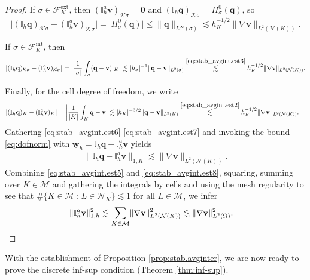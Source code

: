 \documentclass[a4paper,11pt]{article}
\theoremstyle{definition}
\theoremstyle{remark}
\newcommand{\uvec}[1]{\underline{\mathbf{#1}}}
\newcommand{\bo}[1]{\mathbf{#1}}
\newcommand{\mI}[1]{\mathbb I_h\bo{#1}}
\newcommand{\aI}[1]{\mathbb I^{a}_h\bo{#1}}
\def\ext{\text{ext}}
\def\inte{\text{int}}
\def\cF{\mathcal{F}}
\def\cK{\mathcal{K}}
\def\cM{\mathcal{M}}
\def\cN{\mathcal{N}}
\def\O{\Omega}
\begin{document}
\begin{proof}
If $\sigma\in\cF^{\ext}_K$, then $(\aI{v})_{\cK \sigma}=\bo{0}$ and $(\mI{q})_{\cK \sigma}=\Pi^0_\sigma(\bo{q})$, so
\begin{equation*}
\lvert (\mI{q})_{\cK \sigma}-(\aI{v})_{\cK \sigma}\rvert=\lvert \Pi^0_\sigma(\bo{q})\rvert\leq \lVert \bo{q}\rVert_{L^\infty(\sigma)}
\lesssim h^{-1/2}_K\lVert \nabla \bo{v}\rVert_{L^2(\cN(K))}.
\end{equation*}

If $\sigma\in\cF^{\inte}_K$, then
\begin{equation*}
\lvert (\mI{q})_{\cK \sigma}-(\aI{v})_{\cK \sigma}\rvert=\left\vert \frac{1}{\lvert \sigma\rvert}\int_\sigma (\bo{q}-\bo{v})|_K \right\vert\lesssim \lvert h_\sigma\rvert^{-1}\lVert \bo{q}-\bo{v}\rVert_{L^2(\sigma)}\overset{\eqref{eq:stab_avgint.est3}}\lesssim h^{-1/2}_K\lVert \nabla \bo{v}\rVert_{L^2(\cN(K))}.
\end{equation*}

Finally, for the cell degree of freedom, we write
\begin{align}\label{eq:stab_avgint.est7}
\lvert (\mI{q})_{K}-(\aI{v})_{K}\rvert&=\left\vert \frac{1}{\lvert K\rvert}\int_K\bo{q}-\bo{v} \right\vert\lesssim \lvert h_K\rvert^{-3/2}\lVert \bo{q}-\bo{v}\rVert_{L^2(K)}\overset{\eqref{eq:stab_avgint.est2}}\lesssim h^{-1/2}_K\lVert \nabla \bo{v}\rVert_{L^2(\cN(K))}.
\end{align}
Gathering \eqref{eq:stab_avgint.est6}-\eqref{eq:stab_avgint.est7} and invoking the bound \eqref{eq:dofnorm} with $\uvec{w}_h=\mI{q}-\aI{v}$ yields
\begin{align}\label{eq:stab_avgint.est8}
\lVert \mI{q}-\aI{v}\rVert_{1,K}\lesssim \lVert\nabla \bo{v}\rVert_{L^2(\cN(K))}.
\end{align}
Combining \eqref{eq:stab_avgint.est5} and \eqref{eq:stab_avgint.est8}, squaring, summing over $K\in\cM$ and gathering the integrals by cells and using the mesh regularity to see that $\#\{K\in\cM\,:\,L\in\cN_K\}\lesssim 1$ for all $L\in\cM$, we infer
\begin{align*}
\lVert \aI{v}\rVert^2_{1,h}&\lesssim \sum_{K\in\cM}\lVert\nabla\bo{v}\rVert^2_{L^2(\cN(K))}\lesssim \lVert \nabla \bo{v}\rVert^2_{L^2(\O)}.
\qedhere
\end{align*}
\end{proof}
With the establishment of Proposition \ref{prop:stab.avginter}, we are now ready to prove the discrete inf-sup condition (Theorem \ref{thm:inf-sup}).
\end{document}

